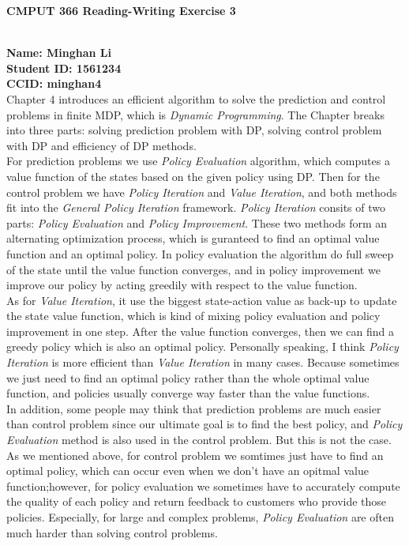 \documentclass[12pt,a4paper]{article}
\begin{document}
\centerline{\large{\textbf{CMPUT 366 Reading-Writing Exercise 3}}}

\ \\
\noindent \textbf{Name: Minghan Li}\\
\textbf{Student ID: 1561234}\\
\textbf{CCID: minghan4}\\

Chapter 4 introduces an efficient algorithm to solve the prediction and control problems in finite MDP, which is \textit{Dynamic Programming}. The Chapter breaks into three parts: solving prediction problem with DP, solving control problem with DP and efficiency of DP methods. \\

For prediction problems we use \textit{Policy Evaluation} algorithm, which computes a value function of the states based on the given policy using DP. Then for the control problem we have \textit{Policy Iteration} and \textit{Value Iteration}, and both methods fit into the \textit{General Policy Iteration} framework. \textit{Policy Iteration} consits of two parts: \textit{Policy Evaluation} and \textit{Policy Improvement}. These two methods form an alternating optimization process, which is guranteed to find an optimal value function and an optimal policy. In policy evaluation the algorithm do full sweep of the state until the value function converges, and in policy improvement we improve our policy by acting greedily with respect to the value function.\\

As for \textit{Value Iteration}, it use the biggest state-action value as back-up to update the state
value function, which is kind of mixing policy evaluation and policy improvement in one step. After the value function converges, then we can find a greedy policy which is also an optimal policy. Personally speaking, I think \textit{Policy Iteration} is more efficient than \textit{Value Iteration} in many cases. Because sometimes we just need to find an optimal policy rather than the whole optimal value function, and policies usually converge way faster than the value functions.\\

In addition, some people may think that prediction problems are much easier than control problem since our ultimate goal is to find the best policy, and \textit{Policy Evaluation} method is also used in the control problem. But this is not the case. As we mentioned above, for control problem we somtimes just have to find an optimal policy, which can occur even  when we don't have an opitmal value function;however, for policy evaluation we sometimes have to accurately compute the quality of each policy and return feedback to customers who provide those policies. Especially, for large and complex problems, \textit{Policy Evaluation} are often much harder than solving control problems.\\
\end{document}

